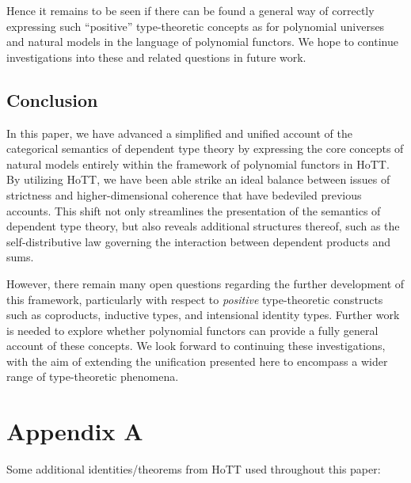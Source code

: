 \documentclass[
  11pt,
  oneside,
  article]{memoir}
\theoremstyle{definition}
\theoremstyle{plain}
\newcommand{\0}{\textsf{0}}
\newcommand{\1}{\tn{\textsf{1}}}
\begin{document}
Hence it remains to be seen if there can be found a general way of
correctly expressing such ``positive'' type-theoretic concepts as for
polynomial universes and natural models in the language of polynomial
functors. We hope to continue investigations into these and related
questions in future work.

\section{Conclusion}\label{conclusion}

In this paper, we have advanced a simplified and unified account of the
categorical semantics of dependent type theory by expressing the core
concepts of natural models entirely within the framework of polynomial
functors in HoTT. By utilizing HoTT, we have been able strike an ideal
balance between issues of strictness and higher-dimensional coherence
that have bedeviled previous accounts. This shift not only streamlines
the presentation of the semantics of dependent type theory, but also
reveals additional structures thereof, such as the self-distributive law
governing the interaction between dependent products and sums.

However, there remain many open questions regarding the further
development of this framework, particularly with respect to
\emph{positive} type-theoretic constructs such as coproducts, inductive
types, and intensional identity types. Further work is needed to explore
whether polynomial functors can provide a fully general account of these
concepts. We look forward to continuing these investigations, with the
aim of extending the unification presented here to encompass a wider
range of type-theoretic phenomena.

\printbibliography

\chapter{Appendix A}\label{appendix-a}

Some additional identities/theorems from HoTT used throughout this
paper:
\end{document}
